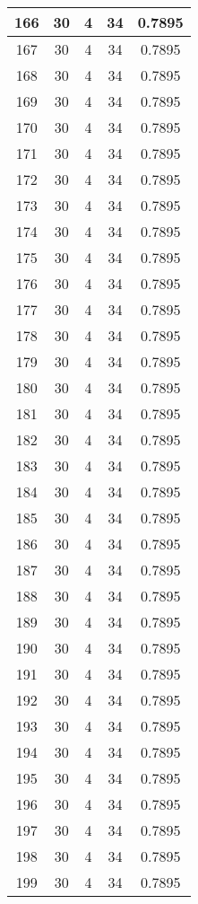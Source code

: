\documentclass[letterpaper, 12pt]{article}
\begin{document}
\begin{longtable}{|c|c|c|c|c|}
\hline
166 & 30 & 4 & 34 & 0.7895 \\
\hline
167 & 30 & 4 & 34 & 0.7895 \\
\hline
168 & 30 & 4 & 34 & 0.7895 \\
\hline
169 & 30 & 4 & 34 & 0.7895 \\
\hline
170 & 30 & 4 & 34 & 0.7895 \\
\hline
171 & 30 & 4 & 34 & 0.7895 \\
\hline
172 & 30 & 4 & 34 & 0.7895 \\
\hline
173 & 30 & 4 & 34 & 0.7895 \\
\hline
174 & 30 & 4 & 34 & 0.7895 \\
\hline
175 & 30 & 4 & 34 & 0.7895 \\
\hline
176 & 30 & 4 & 34 & 0.7895 \\
\hline
177 & 30 & 4 & 34 & 0.7895 \\
\hline
178 & 30 & 4 & 34 & 0.7895 \\
\hline
179 & 30 & 4 & 34 & 0.7895 \\
\hline
180 & 30 & 4 & 34 & 0.7895 \\
\hline
181 & 30 & 4 & 34 & 0.7895 \\
\hline
182 & 30 & 4 & 34 & 0.7895 \\
\hline
183 & 30 & 4 & 34 & 0.7895 \\
\hline
184 & 30 & 4 & 34 & 0.7895 \\
\hline
185 & 30 & 4 & 34 & 0.7895 \\
\hline
186 & 30 & 4 & 34 & 0.7895 \\
\hline
187 & 30 & 4 & 34 & 0.7895 \\
\hline
188 & 30 & 4 & 34 & 0.7895 \\
\hline
189 & 30 & 4 & 34 & 0.7895 \\
\hline
190 & 30 & 4 & 34 & 0.7895 \\
\hline
191 & 30 & 4 & 34 & 0.7895 \\
\hline
192 & 30 & 4 & 34 & 0.7895 \\
\hline
193 & 30 & 4 & 34 & 0.7895 \\
\hline
194 & 30 & 4 & 34 & 0.7895 \\
\hline
195 & 30 & 4 & 34 & 0.7895 \\
\hline
196 & 30 & 4 & 34 & 0.7895 \\
\hline
197 & 30 & 4 & 34 & 0.7895 \\
\hline
198 & 30 & 4 & 34 & 0.7895 \\
\hline
199 & 30 & 4 & 34 & 0.7895 \\
\hline
\end{longtable}
\end{document}
